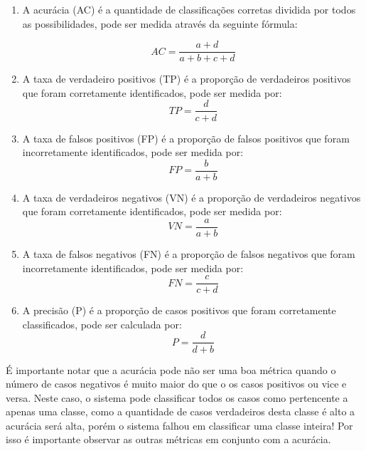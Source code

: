 \begin{enumerate}
\item A acurácia (AC) é a quantidade de classificações corretas dividida por todos as possibilidades, pode ser medida através da seguinte fórmula:
 
\begin{equation}
       AC =  \frac{a + d}{a + b + c + d}
\end{equation}

\item A taxa de verdadeiro positivos (TP) é a proporção de verdadeiros positivos que foram corretamente identificados, pode ser medida por:
\begin{equation}
       TP =  \frac{d}{ c + d}
\end{equation}

\item A taxa de falsos positivos (FP) é a proporção de falsos positivos que foram incorretamente identificados, pode ser medida por:
\begin{equation}
       FP =  \frac{b}{ a + b}
\end{equation}
  
\item A taxa de verdadeiros negativos (VN) é a proporção de verdadeiros negativos que foram corretamente identificados, pode ser medida por:
\begin{equation}
       VN =  \frac{a}{ a + b}
\end{equation}
  
\item A taxa de falsos negativos (FN) é a proporção de falsos negativos que foram incorretamente identificados, pode ser medida por:
\begin{equation}
       FN =  \frac{c}{c + d}
\end{equation}

\item A precisão (P) é a proporção de casos positivos que foram corretamente classificados, pode ser calculada por:
\begin{equation}
       P =  \frac{d}{d + b}
\end{equation}

\end{enumerate}

É importante notar que a acurácia pode não ser uma boa métrica quando o número de casos negativos é muito maior do que o os casos positivos ou vice e versa. Neste caso, o sistema pode classificar todos os casos como pertencente a apenas uma classe, como a quantidade de casos verdadeiros desta classe é alto a acurácia será alta, porém o sistema falhou em classificar uma classe inteira! Por isso é importante observar as outras métricas em conjunto com a acurácia.

